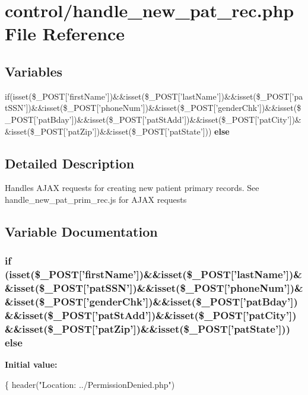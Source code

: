\hypertarget{handle__new__pat__rec_8php}{\section{control/handle\-\_\-new\-\_\-pat\-\_\-rec.php File Reference}
\label{handle__new__pat__rec_8php}
}
\subsection*{Variables}
\begin{DoxyCompactItemize}
\item 
if(isset(\$\-\_\-\-P\-O\-S\-T\mbox{[}'first\-Name'\mbox{]})\&\&isset(\$\-\_\-\-P\-O\-S\-T\mbox{[}'last\-Name'\mbox{]})\&\&isset(\$\-\_\-\-P\-O\-S\-T\mbox{[}'pat\-S\-S\-N'\mbox{]})\&\&isset(\$\-\_\-\-P\-O\-S\-T\mbox{[}'phone\-Num'\mbox{]})\&\&isset(\$\-\_\-\-P\-O\-S\-T\mbox{[}'gender\-Chk'\mbox{]})\&\&isset(\$\-\_\-\-P\-O\-S\-T\mbox{[}'pat\-Bday'\mbox{]})\&\&isset(\$\-\_\-\-P\-O\-S\-T\mbox{[}'pat\-St\-Add'\mbox{]})\&\&isset(\$\-\_\-\-P\-O\-S\-T\mbox{[}'pat\-City'\mbox{]})\&\&isset(\$\-\_\-\-P\-O\-S\-T\mbox{[}'pat\-Zip'\mbox{]})\&\&isset(\$\-\_\-\-P\-O\-S\-T\mbox{[}'pat\-State'\mbox{]})) {\bfseries else}
\end{DoxyCompactItemize}


\subsection{Detailed Description}
Handles A\-J\-A\-X requests for creating new patient primary records. See handle\-\_\-new\-\_\-pat\-\_\-prim\-\_\-rec.\-js for A\-J\-A\-X requests 

\subsection{Variable Documentation}
\hypertarget{handle__new__pat__rec_8php_a368238c368fe2cdb1f7ddccb3d054563}{
\subsubsection[{else}]{\setlength{\rightskip}{0pt plus 5cm}if (isset(\$\-\_\-\-P\-O\-S\-T\mbox{[}'first\-Name'\mbox{]})\&\&isset(\$\-\_\-\-P\-O\-S\-T\mbox{[}'last\-Name'\mbox{]})\&\&isset(\$\-\_\-\-P\-O\-S\-T\mbox{[}'pat\-S\-S\-N'\mbox{]})\&\&isset(\$\-\_\-\-P\-O\-S\-T\mbox{[}'phone\-Num'\mbox{]})\&\&isset(\$\-\_\-\-P\-O\-S\-T\mbox{[}'gender\-Chk'\mbox{]})\&\&isset(\$\-\_\-\-P\-O\-S\-T\mbox{[}'pat\-Bday'\mbox{]})\&\&isset(\$\-\_\-\-P\-O\-S\-T\mbox{[}'pat\-St\-Add'\mbox{]})\&\&isset(\$\-\_\-\-P\-O\-S\-T\mbox{[}'pat\-City'\mbox{]})\&\&isset(\$\-\_\-\-P\-O\-S\-T\mbox{[}'pat\-Zip'\mbox{]})\&\&isset(\$\-\_\-\-P\-O\-S\-T\mbox{[}'pat\-State'\mbox{]})) else}}\label{handle__new__pat__rec_8php_a368238c368fe2cdb1f7ddccb3d054563}
{\bfseries Initial value\-:}
\begin{DoxyCode}
\{
    header(\textcolor{stringliteral}{"Location: ../PermissionDenied.php"})
\end{DoxyCode}

